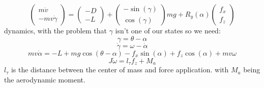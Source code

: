 \documentclass{article}
\begin{document}
\[\begin{pmatrix}m\dot{v}\\-mv\dot{\gamma}\end{pmatrix}=\begin{pmatrix}-D\\-L\end{pmatrix}+\begin{pmatrix}-\sin(\gamma)\\\cos(\gamma)\end{pmatrix}mg+R_y(\alpha)\begin{pmatrix}f_x\\f_z\end{pmatrix}\]
dynamics, with the problem that $\gamma$ isn't one of our states so we need:
\[\gamma=\theta-\alpha\]
\[\dot{\gamma}=\omega-\dot{\alpha}\]
\[mv\dot{\alpha}=-L+mg\cos(\theta-\alpha)-f_x\sin(\alpha)+f_z\cos(\alpha)+mv\omega\]
\[J\dot{\omega}=l_\tau f_z+M_a\]
$l_\tau$ is the distance between the center of mass and force application. with $M_a$ being the aerodynamic moment.\\
\end{document}
